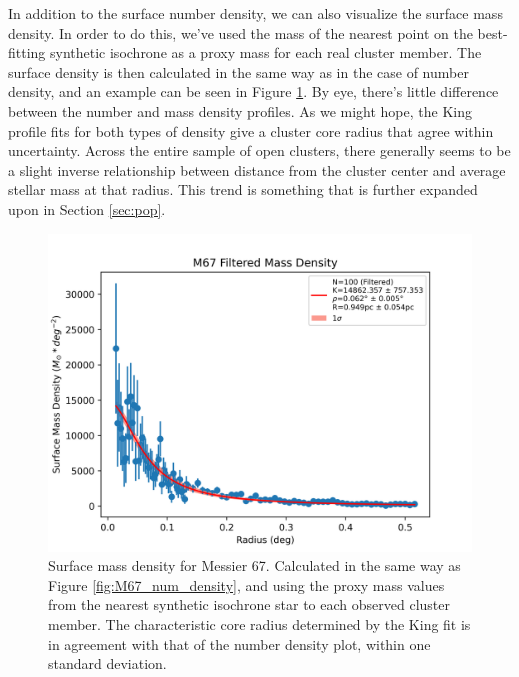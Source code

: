 \documentclass[onecolumn,table,xcdraw,super]{aastex631}
\begin{document}
In addition to the surface number density, we can also visualize the surface mass density. In order to do this, we've used the mass of the nearest point on the best-fitting synthetic isochrone as a proxy mass for each real cluster member. The surface density is then calculated in the same way as in the case of number density, and an example can be seen in Figure \ref{fig:M67_mass_density}. By eye, there's little difference between the number and mass density profiles. As we might hope, the King profile fits for both types of density give a cluster core radius that agree within uncertainty. Across the entire sample of open clusters, there generally seems to be a slight inverse relationship between distance from the cluster center and average stellar mass at that radius. This trend is something that is further expanded upon in Section \ref{sec:pop}.

\begin{figure}[]
    \centering
      \includegraphics[width=4.75in]{figures/M67_massDensity_filtered.png}
    \caption{Surface mass density for Messier 67. Calculated in the same way as Figure \ref{fig:M67_num_density}, and using the proxy mass values from the nearest synthetic isochrone star to each observed cluster member. The characteristic core radius determined by the King fit is in agreement with that of the number density plot, within one standard deviation.}
    \label{fig:M67_mass_density}
\end{figure}
\end{document}
